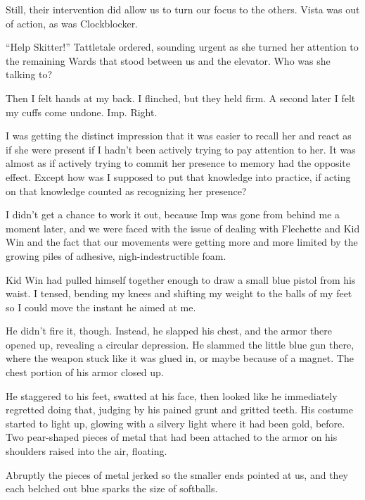 Still, their intervention did allow us to turn our focus to the others.  Vista was out of action, as was Clockblocker.



``Help Skitter!'' Tattletale ordered, sounding urgent as she turned her attention to the remaining Wards that stood between us and the elevator.  Who was she talking to?



Then I felt hands at my back.  I flinched, but they held firm.  A second later I felt my cuffs come undone.  Imp.  Right.



I was getting the distinct impression that it was easier to recall her and react as if she were present if I hadn't been actively trying to pay attention to her.  It was almost as if actively trying to commit her presence to memory had the opposite effect.  Except how was I supposed to put that knowledge into practice, if acting on that knowledge counted as recognizing her presence?



I didn't get a chance to work it out, because Imp was gone from behind me a moment later, and we were faced with the issue of dealing with Flechette and Kid Win and the fact that our movements were getting more and more limited by the growing piles of adhesive, nigh-indestructible foam.



Kid Win had pulled himself together enough to draw a small blue pistol from his waist.  I tensed, bending my knees and shifting my weight to the balls of my feet so I could move the instant he aimed at me.



He didn't fire it, though.  Instead, he slapped his chest, and the armor there opened up, revealing a circular depression.  He slammed the little blue gun there, where the weapon stuck like it was glued in, or maybe because of a magnet.  The chest portion of his armor closed up.



He staggered to his feet, swatted at his face, then looked like he immediately regretted doing that, judging by his pained grunt and gritted teeth.  His costume started to light up, glowing with a silvery light where it had been gold, before.  Two pear-shaped pieces of metal that had been attached to the armor on his shoulders raised into the air, floating.



Abruptly the pieces of metal jerked so the smaller ends pointed at us, and they each belched out blue sparks the size of softballs.



